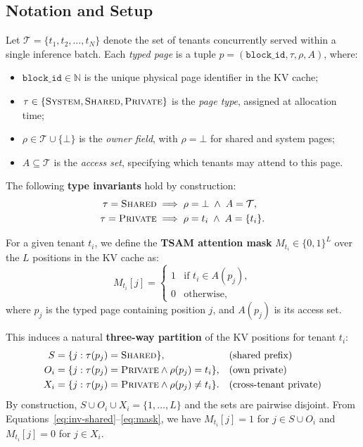 \documentclass[11pt]{article}
\begin{document}
\subsection{Notation and Setup}
\label{sec:formal:notation}

Let $\mathcal{T} = \{t_1, t_2, \ldots, t_N\}$ denote the set of tenants concurrently
served within a single inference batch. Each \emph{typed page} is a tuple
$p = (\texttt{block\_id}, \tau, \rho, A)$, where:
\begin{itemize}[leftmargin=1.5em,itemsep=2pt]
    \item $\texttt{block\_id} \in \mathbb{N}$ is the unique physical page identifier in
          the KV cache;
    \item $\tau \in \{\textsc{System}, \textsc{Shared}, \textsc{Private}\}$ is the
          \emph{page type}, assigned at allocation time;
    \item $\rho \in \mathcal{T} \cup \{\bot\}$ is the \emph{owner field}, with
          $\rho = \bot$ for shared and system pages;
    \item $A \subseteq \mathcal{T}$ is the \emph{access set}, specifying which tenants
          may attend to this page.
\end{itemize}

\noindent
The following \textbf{type invariants} hold by construction:
\begin{align}
    \tau = \textsc{Shared}  &\implies \rho = \bot \;\wedge\; A = \mathcal{T}, \label{eq:inv-shared}\\
    \tau = \textsc{Private} &\implies \rho = t_i \;\wedge\; A = \{t_i\}. \label{eq:inv-private}
\end{align}

For a given tenant $t_i$, we define the \textbf{TSAM attention mask} $M_{t_i} \in \{0,1\}^L$
over the $L$ positions in the KV cache as:
\begin{equation}
    M_{t_i}[j] = \begin{cases}
        1 & \text{if } t_i \in A(p_j), \\
        0 & \text{otherwise},
    \end{cases}
    \label{eq:mask}
\end{equation}
where $p_j$ is the typed page containing position $j$, and $A(p_j)$ is its access set.

This induces a natural \textbf{three-way partition} of the KV positions for tenant $t_i$:
\begin{align}
    S      &= \{j : \tau(p_j) = \textsc{Shared}\},   && \text{(shared prefix)} \\
    O_i    &= \{j : \tau(p_j) = \textsc{Private} \wedge \rho(p_j) = t_i\}, && \text{(own private)} \\
    X_i    &= \{j : \tau(p_j) = \textsc{Private} \wedge \rho(p_j) \neq t_i\}. && \text{(cross-tenant private)}
\end{align}
By construction, $S \cup O_i \cup X_i = \{1, \ldots, L\}$ and the sets are pairwise disjoint.
From Equations~\eqref{eq:inv-shared}--\eqref{eq:mask}, we have $M_{t_i}[j] = 1$ for
$j \in S \cup O_i$ and $M_{t_i}[j] = 0$ for $j \in X_i$.
\end{document}
